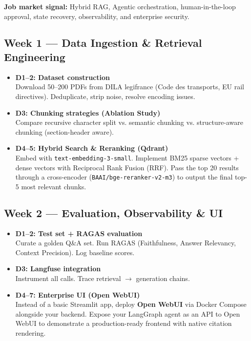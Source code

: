 \documentclass[11pt,a4paper]{article}
\begin{document}
\textbf{Job market signal:} Hybrid RAG, Agentic orchestration, human-in-the-loop approval, state recovery, observability, and enterprise security.

\subsection*{Week 1 — Data Ingestion \& Retrieval Engineering}

\begin{tcolorbox}[systembox={ Step-by-Step}]
\begin{itemize}[leftmargin=*]
    \item \textbf{D1–2: Dataset construction}\\
          Download 50–200 PDFs from DILA legifrance (Code des transports, EU rail directives). Deduplicate, strip noise, resolve encoding issues.
    \item \textbf{D3: Chunking strategies (Ablation Study)}\\
          Compare recursive character split vs. semantic chunking vs. structure-aware chunking (section-header aware).
  \item \textbf{D4–5: Hybrid Search \& Reranking (Qdrant)}\\
      Embed with \texttt{text-embedding-3-small}. Implement BM25 sparse vectors + dense vectors with Reciprocal Rank Fusion (RRF). Pass the top 20 results through a cross-encoder (\texttt{BAAI/bge-reranker-v2-m3}) to output the final top-5 most relevant chunks. 
\end{itemize}
\end{tcolorbox}

\subsection*{Week 2 — Evaluation, Observability \& UI}

\begin{tcolorbox}[systembox={ Step-by-Step}]
\begin{itemize}[leftmargin=*]
    \item \textbf{D1–2: Test set + RAGAS evaluation}\\
          Curate a golden Q\&A set. Run RAGAS (Faithfulness, Answer Relevancy, Context Precision). Log baseline scores.
    \item \textbf{D3: Langfuse integration}\\
          Instrument all calls. Trace retrieval $\rightarrow$ generation chains.
    \item \textbf{D4–7: Enterprise UI (Open WebUI)}\\
          Instead of a basic Streamlit app, deploy \textbf{Open WebUI} via Docker Compose alongside your backend. Expose your LangGraph agent as an API to Open WebUI to demonstrate a production-ready frontend with native citation rendering.
\end{itemize}
\end{tcolorbox}
\end{document}
